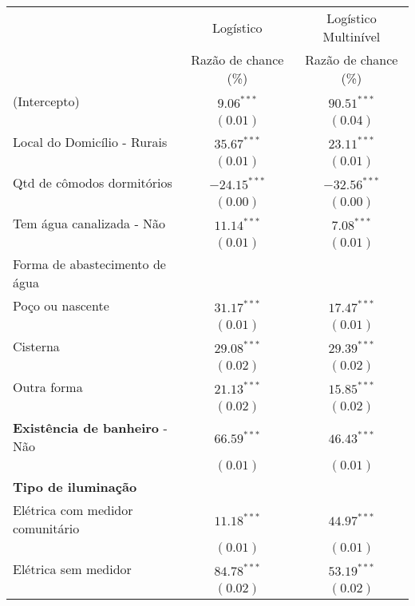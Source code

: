 \documentclass[a4paper, 12pt, openright, oneside, english, brazil, article]{abntex2}
\begin{document}
	\begin{table}[!h]
		{\begin{tabular}{l c c}
				\hline
				& Logístico & Logístico Multinível \\
				& Razão de chance (\%)  & Razão de chance (\%) \\
				\hline
				(Intercepto)                                                 & $9.06^{***}$  & $90.51^{***}$  \\
				& $(0.01)$      & $(0.04)$      \\
				Local do Domicílio - Rurais                                & $35.67^{***}$  & $23.11^{***}$  \\
				& $(0.01)$      & $(0.01)$      \\
				Qtd de cômodos dormitórios                               & $-24.15^{***}$ & $-32.56^{***}$ \\
				& $(0.00)$      & $(0.00)$      \\
				Tem água canalizada - Não                               & $11.14^{***}$  & $7.08^{***}$  \\
				& $(0.01)$      & $(0.01)$      \\
				Forma de abastecimento de água &   &   \\
				Poço ou nascente               & $31.17^{***}$  & $17.47^{***}$  \\
				& $(0.01)$      & $(0.01)$      \\
				Cisterna                       & $29.08^{***}$  & $29.39^{***}$  \\
				& $(0.02)$      & $(0.02)$      \\
				Outra forma                    & $21.13^{***}$  & $15.85^{***}$  \\
				& $(0.02)$      & $(0.02)$      \\
				\textbf{Existência de banheiro} - Não                 & $66.59^{***}$  & $46.43^{***}$  \\
				& $(0.01)$      & $(0.01)$      \\
				\textbf{Tipo de iluminação}   &    &    \\
				Elétrica com medidor comunitário & $11.18^{***}$  & $44.97^{***}$  \\
				& $(0.01)$      & $(0.01)$      \\
				Elétrica sem medidor             & $84.78^{***}$  & $53.19^{***}$  \\
				& $(0.02)$      & $(0.02)$      \\

\end{tabular}}
\end{table}
\end{document}
